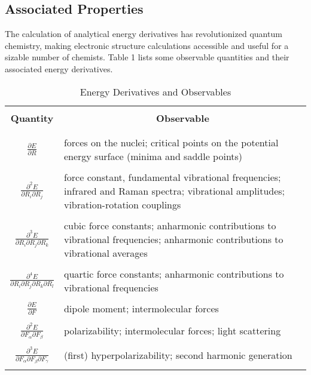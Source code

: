 \subsection{Associated Properties}
    The calculation of analytical energy derivatives has revolutionized quantum chemistry, making electronic structure calculations accessible and useful for a sizable number of chemists. Table 1 lists some observable quantities and their associated energy derivatives\cite{Pulay1995}. 
    \begin{table}
    \caption {Energy Derivatives and Observables}
    \small
    \begin{center}
        \begin{tabular} {| c | p{13cm} | }
            \hline & \\
            \multicolumn{1}{|c|}{\bfseries Quantity} & \multicolumn{1}{|c|}{\bfseries Observable} \\ & \\
            \hline & \\
            $\frac{\partial E}{\partial R}$ & forces on the nuclei; critical points on the potential energy surface (minima and saddle points) \\ & \\
            $\frac{\partial^2 E}{\partial R_i \partial R_j}$ & force constant, fundamental vibrational frequencies; infrared and Raman spectra; vibrational amplitudes; vibration-rotation couplings \\ & \\
            $\frac{\partial^3 E}{\partial R_i \partial R_j \partial R_k}$ & cubic force constants; anharmonic contributions to vibrational frequencies; anharmonic contributions to vibrational averages \\ & \\
            $\frac{\partial^4 E}{\partial R_i \partial R_j \partial R_k \partial R_l}$ & quartic force constants; anharmonic contributions to vibrational frequencies \\ & \\
            $\frac{\partial E}{\partial F}$ & dipole moment; intermolecular forces \\ & \\
            $\frac{\partial^2 E}{\partial F_\alpha \partial F_\beta}$ & polarizability; intermolecular forces; light scattering \\ & \\
            $\frac{\partial^3 E}{\partial F_\alpha \partial F_\beta \partial F_\gamma}$ & (first) hyperpolarizability; second harmonic generation \\ & \\

\end{tabular}
\end{center}
\end{table}
